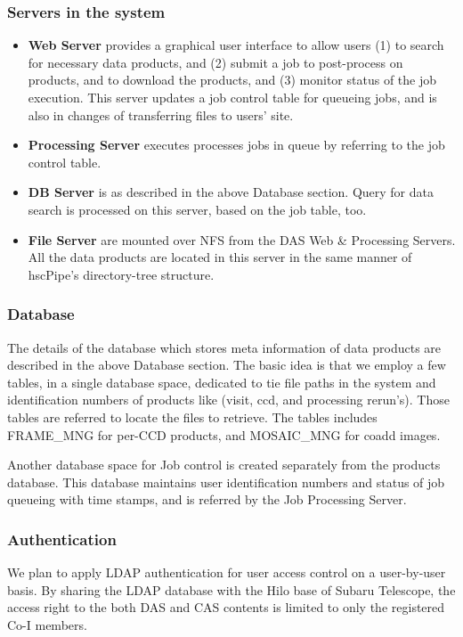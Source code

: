 \documentclass[12pt]{article}
\begin{document}
\subsubsection{Servers in the system}
\begin{itemize}
\item {\bf Web Server} provides a graphical user interface to allow users 
(1) to search for necessary data products, and (2) submit a job to
post-process on products, and to download the products, and (3) monitor
status of the job execution. This server updates a job control table
for queueing jobs, and is also in changes of transferring files
to users' site.

\item {\bf Processing Server} executes processes jobs in queue by
     referring to the job control table.

\item {\bf DB Server} is as described in the above Database
     section. Query for data search is processed on this server, based
     on the job table, too.

\item {\bf File Server} are mounted over NFS from the DAS Web \&
     Processing Servers. All the data products are located in this
     server in the same manner of hscPipe's directory-tree structure.
\end{itemize}

\subsubsection{Database}
The details of the database which stores meta information of data products
are described in the above Database section. The basic idea is that we
employ a few tables, in a single database space, dedicated to tie file
paths in the system and identification numbers of products like (visit,
ccd, and processing rerun's). Those tables are referred to locate the
files to retrieve. The tables includes FRAME\_MNG for per-CCD products, and 
MOSAIC\_MNG for coadd images. 

Another database space for Job control is created separately from the
products database. This database maintains user identification numbers
and status of job queueing with time stamps, and is referred by the Job
Processing Server.

\subsubsection{Authentication}
We plan to apply LDAP authentication for user access control on a
user-by-user basis. By sharing the LDAP database with the Hilo base of
Subaru Telescope, the access right to the both DAS and CAS contents is
limited to only the registered Co-I members. 
\end{document}
